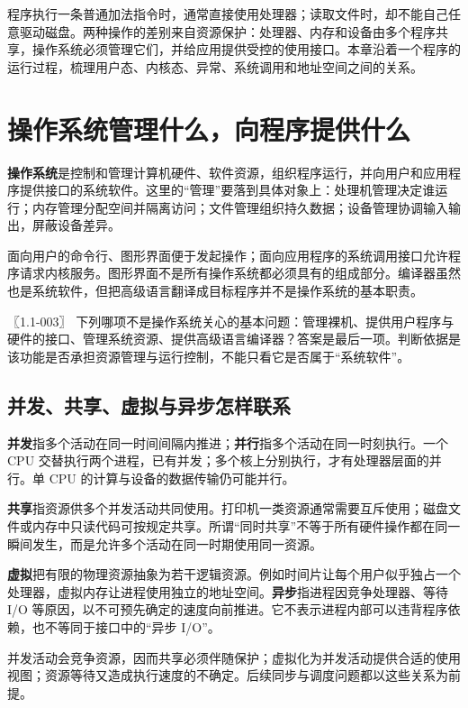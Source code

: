 程序执行一条普通加法指令时，通常直接使用处理器；读取文件时，却不能自己任意驱动磁盘。两种操作的差别来自资源保护：处理器、内存和设备由多个程序共享，操作系统必须管理它们，并给应用提供受控的使用接口。本章沿着一个程序的运行过程，梳理用户态、内核态、异常、系统调用和地址空间之间的关系。

\section{操作系统管理什么，向程序提供什么}\label{OS01-1-1}

\textbf{操作系统}是控制和管理计算机硬件、软件资源，组织程序运行，并向用户和应用程序提供接口的系统软件。这里的``管理''要落到具体对象上：处理机管理决定谁运行；内存管理分配空间并隔离访问；文件管理组织持久数据；设备管理协调输入输出，屏蔽设备差异。

面向用户的命令行、图形界面便于发起操作；面向应用程序的系统调用接口允许程序请求内核服务。图形界面不是所有操作系统都必须具有的组成部分。编译器虽然也是系统软件，但把高级语言翻译成目标程序并不是操作系统的基本职责。

〖1.1-003〗 下列哪项不是操作系统关心的基本问题：管理裸机、提供用户程序与硬件的接口、管理系统资源、提供高级语言编译器？答案是最后一项。判断依据是该功能是否承担资源管理与运行控制，不能只看它是否属于``系统软件''。

\subsection{并发、共享、虚拟与异步怎样联系}\label{OS01-auto-1}

\textbf{并发}指多个活动在同一时间间隔内推进；\textbf{并行}指多个活动在同一时刻执行。一个 CPU 交替执行两个进程，已有并发；多个核上分别执行，才有处理器层面的并行。单 CPU 的计算与设备的数据传输仍可能并行。

\textbf{共享}指资源供多个并发活动共同使用。打印机一类资源通常需要互斥使用；磁盘文件或内存中只读代码可按规定共享。所谓``同时共享''不等于所有硬件操作都在同一瞬间发生，而是允许多个活动在同一时期使用同一资源。

\textbf{虚拟}把有限的物理资源抽象为若干逻辑资源。例如时间片让每个用户似乎独占一个处理器，虚拟内存让进程使用独立的地址空间。\textbf{异步}指进程因竞争处理器、等待 I/O 等原因，以不可预先确定的速度向前推进。它不表示进程内部可以违背程序依赖，也不等同于接口中的``异步 I/O''。

并发活动会竞争资源，因而共享必须伴随保护；虚拟化为并发活动提供合适的使用视图；资源等待又造成执行速度的不确定。后续同步与调度问题都以这些关系为前提。


